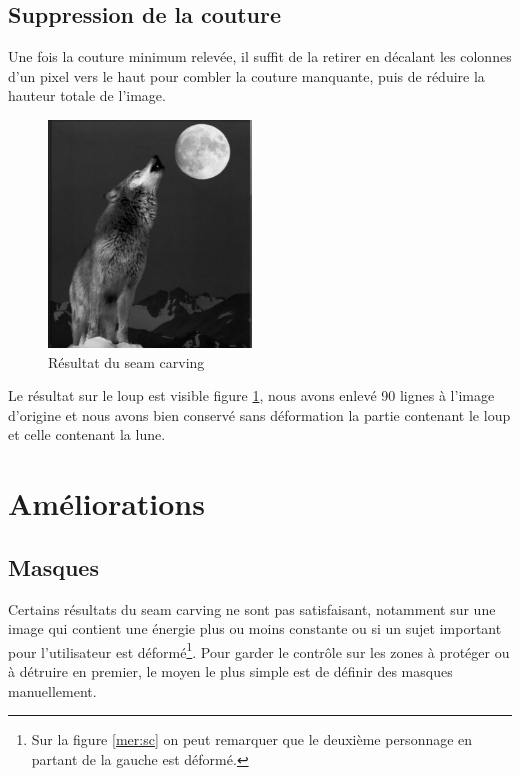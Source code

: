\documentclass{article}
\begin{document}
\subsection{Suppression de la couture}

Une fois la couture minimum relevée, il suffit de la retirer en décalant les colonnes 
d'un pixel vers le haut pour combler la couture manquante, puis de réduire la hauteur totale de l'image.

\begin{figure}[!ht]
    \center
    \includegraphics[width=0.48\textwidth]{img/reduced.png}
    \caption{Résultat du seam carving}
    \label{loup_reduced}
\end{figure}

Le résultat sur le loup est visible figure \ref{loup_reduced}, nous avons enlevé 90 lignes 
à l'image d'origine et nous avons bien conservé sans déformation la partie contenant le loup 
et celle contenant la lune.

\section{Améliorations}
\subsection{Masques}

Certains résultats du seam carving ne sont pas satisfaisant, notamment sur une image qui contient
une énergie plus ou moins constante ou si un sujet important pour l'utilisateur est déformé\footnote{Sur la figure \ref{mer:sc} on peut remarquer que le deuxième personnage en partant de la gauche est déformé.}.
Pour garder le contrôle sur les zones à protéger ou à détruire en premier, le moyen le plus 
simple est de définir des masques manuellement.
\end{document}

